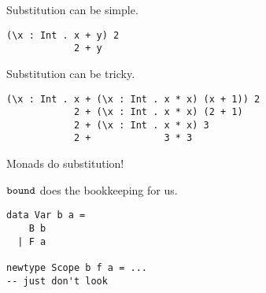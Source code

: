 \documentclass[aspectration=169]{beamer}
\begin{document}
\begin{frame}[fragile]
  \begin{center}
   Substitution can be simple.
  \end{center}
  \begin{verbatim}
(\x : Int . x + y) 2
            2 + y
  \end{verbatim}  
\end{frame}

\begin{frame}[fragile]
  \begin{center}
   Substitution can be tricky.
  \end{center}
  \begin{verbatim}
(\x : Int . x + (\x : Int . x * x) (x + 1)) 2
            2 + (\x : Int . x * x) (2 + 1)
            2 + (\x : Int . x * x) 3
            2 +             3 * 3
  \end{verbatim}  
\end{frame}

\begin{frame}[fragile]
  \begin{center}
    Monads do substitution!
  \end{center}
\end{frame}

\begin{frame}[fragile]
  \begin{center}
    $\tt{bound}$ does the bookkeeping for us.
  \end{center}
\end{frame}

\begin{frame}[fragile]
  \begin{verbatim}
data Var b a = 
    B b 
  | F a

newtype Scope b f a = ...
-- just don't look
  \end{verbatim}  
\end{frame}
\end{document}
